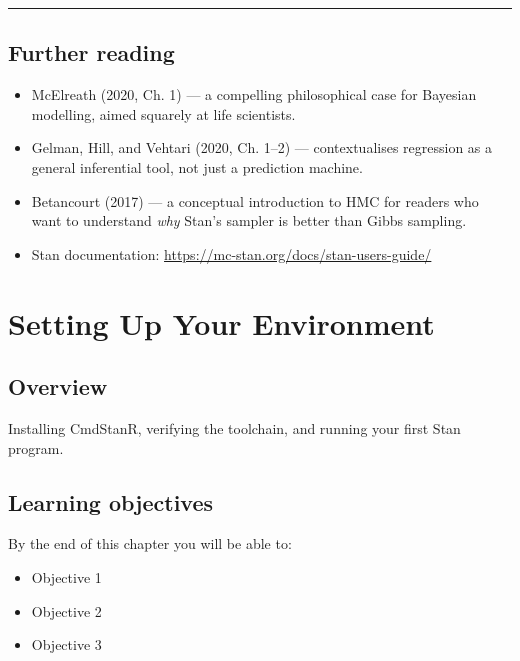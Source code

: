 \documentclass[
  11pt,
  a4paper,
  oneside,
  openany]{scrbook}
\providecommand{\tightlist}{%
  \setlength{\itemsep}{0pt}\setlength{\parskip}{0pt}}\usepackage{longtable,booktabs,array}
\begin{document}
\begin{center}\rule{0.5\linewidth}{0.5pt}\end{center}

\section{Further reading}\label{further-reading}

\begin{itemize}
\tightlist
\item
  McElreath (2020, Ch. 1) --- a compelling philosophical case for
  Bayesian modelling, aimed squarely at life scientists.
\item
  Gelman, Hill, and Vehtari (2020, Ch. 1--2) --- contextualises
  regression as a general inferential tool, not just a prediction
  machine.
\item
  Betancourt (2017) --- a conceptual introduction to HMC for readers who
  want to understand \emph{why} Stan's sampler is better than Gibbs
  sampling.
\item
  Stan documentation: \url{https://mc-stan.org/docs/stan-users-guide/}
\end{itemize}

\chapter{Setting Up Your Environment}\label{setting-up-your-environment}

\section{Overview}\label{overview-1}

Installing CmdStanR, verifying the toolchain, and running your first
Stan program.

\section{Learning objectives}\label{learning-objectives-1}

By the end of this chapter you will be able to:

\begin{itemize}
\tightlist
\item[$\square$]
  Objective 1
\item[$\square$]
  Objective 2
\item[$\square$]
  Objective 3
\end{itemize}
\end{document}
